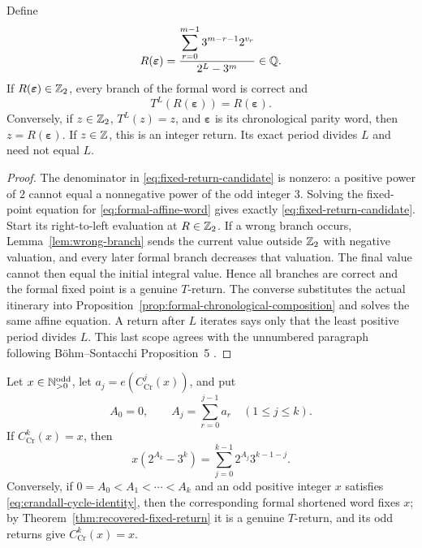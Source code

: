 \begin{theorem}
\label{thm:recovered-fixed-return}
Define
\begin{equation}
\label{eq:fixed-return-candidate}
 R(\boldsymbol\varepsilon)=
 \frac{\displaystyle\sum_{r=0}^{m-1}3^{m-r-1}2^{v_r}}
      {2^L-3^m}\in\mathbb{Q}.
\end{equation}
If $R(\boldsymbol\varepsilon)\in\mathbb{Z}_{2}$, every branch of the formal word is
correct and
\[
 T^L(R(\boldsymbol\varepsilon))=R(\boldsymbol\varepsilon).
\]
Conversely, if $z\in\mathbb{Z}_{2}$, $T^L(z)=z$, and
$\boldsymbol\varepsilon$ is its chronological parity word, then
$z=R(\boldsymbol\varepsilon)$.  If $z\in\mathbb{Z}$, this is an integer return.  Its
exact period divides $L$ and need not equal $L$.
\end{theorem}

\begin{proof}
The denominator in \eqref{eq:fixed-return-candidate} is nonzero: a positive
power of $2$ cannot equal a nonnegative power of the odd integer $3$.
Solving the fixed-point equation for \eqref{eq:formal-affine-word} gives
exactly \eqref{eq:fixed-return-candidate}.  Start its right-to-left evaluation
at $R\in\mathbb{Z}_{2}$.  If a wrong branch occurs, Lemma~\ref{lem:wrong-branch} sends
the current value outside $\mathbb{Z}_{2}$ with negative valuation, and every later
formal branch decreases that valuation.  The final value cannot then equal
the initial integral value.  Hence all branches are correct and the formal
fixed point is a genuine $T$-return.  The converse substitutes the actual
itinerary into Proposition~\ref{prop:formal-chronological-composition} and
solves the same affine equation.  A return after $L$ iterates says only that
the least positive period divides $L$.  This last scope agrees with the
unnumbered paragraph following B\"ohm--Sontacchi Proposition~5
\cite[printed p.~264]{BohmSontacchi1978}.
\end{proof}

\begin{corollary}
\label{cor:crandall-cycle-identity}
Let $x\in\mathbb{N}_{>0}^{\mathrm{odd}}$, let
$a_j=e(C_{\mathrm{Cr}}^j(x))$, and put
\[
 A_0=0,
 \qquad
 A_j=\sum_{r=0}^{j-1}a_r\quad(1\leq j\leq k).
\]
If $C_{\mathrm{Cr}}^k(x)=x$, then
\begin{equation}
\label{eq:crandall-cycle-identity}
 x(2^{A_k}-3^k)
 =\sum_{j=0}^{k-1}2^{A_j}3^{k-1-j}.
\end{equation}
Conversely, if $0=A_0<A_1<\cdots<A_k$ and an odd positive integer $x$
satisfies \eqref{eq:crandall-cycle-identity}, then the corresponding formal
shortened word fixes $x$; by Theorem~\ref{thm:recovered-fixed-return} it is a
genuine $T$-return, and its odd returns give
$C_{\mathrm{Cr}}^k(x)=x$.
\end{corollary}

